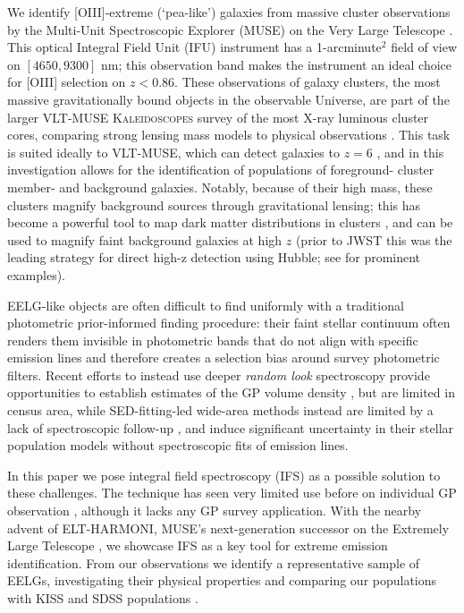 \documentclass[fleqn,usenatbib]{mnras}
\begin{document}
We identify [OIII]-extreme (‘pea-like’) galaxies from massive cluster observations by the Multi-Unit Spectroscopic Explorer (MUSE) on the Very Large Telescope \citep{bacon2010}. This optical Integral Field Unit (IFU) instrument has a 1-arcminute$^2$ field of view on $[4650, 9300]$ nm; this observation band makes the instrument an ideal choice for [OIII] selection on $z<0.86$. These observations of galaxy clusters, the most massive gravitationally bound objects in the observable Universe, are part of the larger VLT-MUSE \textsc{Kaleidoscopes} survey of the most X-ray luminous cluster cores, comparing strong lensing mass models to physical observations \citep{jauzac,jauzac2021,cerny2025}. This task is suited ideally to VLT-MUSE, which can detect galaxies to $z=6$ \citep{bacon2015}, and in this investigation allows for the identification of populations of foreground- cluster member- and background galaxies. Notably, because of their high mass, these clusters magnify background sources through gravitational lensing; this has become a powerful tool to map dark matter distributions in clusters \citep{massey2010}, and can be used to magnify faint background galaxies at high $z$ (prior to JWST this was the leading strategy for direct high-z detection using Hubble; see \cite{livermore2017, bouwens2018,kawamata2018} for prominent examples).

EELG-like objects are often difficult to find uniformly with a traditional photometric prior-informed finding procedure: their faint stellar continuum often renders them invisible in photometric bands that do not align with specific emission lines and therefore creates a selection bias around survey photometric filters. Recent efforts to instead use deeper \textit{random look} spectroscopy provide opportunities to establish estimates of the GP volume density \citep{amorin2015, brunker_2020, miller2024}, but are limited in census area, while SED-fitting-led wide-area methods instead are limited by a lack of spectroscopic follow-up \cite{yang2017, samonski2025}, and induce significant uncertainty in their stellar population models without spectroscopic fits of emission lines. 

In this paper we pose integral field spectroscopy (IFS) as a possible solution to these challenges. The technique has seen very limited use before on individual GP observation \citep{bosch2019, polonio2023}, although it lacks any GP survey application. With the nearby advent of ELT-HARMONI, MUSE’s next-generation successor on the Extremely Large Telescope \citep{harmoni2021}, we showcase IFS as a key tool for extreme emission identification. From our observations we identify a representative sample of EELGs, investigating their physical properties and comparing our populations with KISS and SDSS populations \citep{brunker_2020,samonski2025, jiang}.
\end{document}
